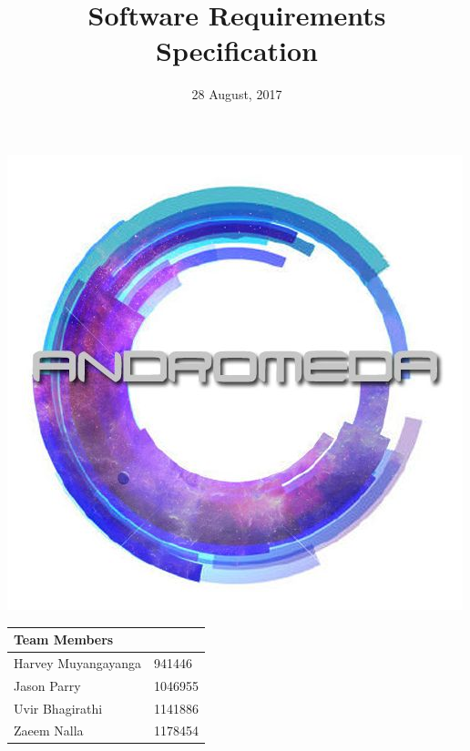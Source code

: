 \documentclass{article}
\begin{document}
\begin{titlepage}
\title{\textbf{\Huge Software Requirements Specification}}
\date{\large 28 August, 2017}
\bigskip
\bigskip
\maketitle
\thispagestyle{empty}
\centerline{\includegraphics[scale=0.65]{AndromedaLogo}}

\begin{table}
\Large
\begin{center}
\begin{tabular}{|m{5cm}|m{5cm}|}
\hline
\multicolumn{2}{|m{10cm}|}{\textbf{Team Members}\centering} \\
\hline
\hline
Harvey Muyangayanga & 941446\\
Jason Parry & 1046955\\
Uvir Bhagirathi & 1141886\\
Zaeem Nalla & 1178454\\
\hline
\end{tabular}
\end{center}
\end{table}

\end{titlepage}

\tableofcontents
{}
\cleardoublepage{}
\pagebreak
\end{document}
